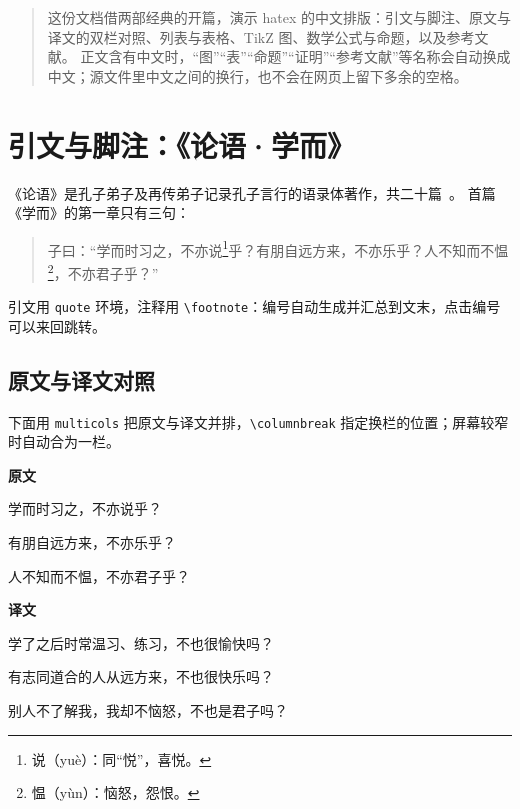 \usetikzlibrary{arrows.meta,positioning}

\begin{abstract}
这份文档借两部经典的开篇，演示 hatex 的中文排版：引文与脚注、原文与译文的双栏对照、列表与表格、TikZ 图、数学公式与命题，以及参考文献。
正文含有中文时，“图”“表”“命题”“证明”“参考文献”等名称会自动换成中文；源文件里中文之间的换行，也不会在网页上留下多余的空格。
\end{abstract}

\section{引文与脚注：《论语·学而》}\label{sec:lunyu}
《论语》是孔子弟子及再传弟子记录孔子言行的语录体著作，共二十篇~\cite{yang1980}。
首篇《学而》的第一章只有三句：
\begin{quote}
子曰：“学而时习之，不亦说\footnote{说（yuè）：同“悦”，喜悦。}乎？有朋自远方来，不亦乐乎？人不知而不愠\footnote{愠（yùn）：恼怒，怨恨。}，不亦君子乎？”
\end{quote}
引文用 \texttt{quote} 环境，注释用 \verb|\footnote|：编号自动生成并汇总到文末，点击编号可以来回跳转。

\subsection{原文与译文对照}\label{sec:parallel}
下面用 \texttt{multicols} 把原文与译文并排，\verb|\columnbreak| 指定换栏的位置；屏幕较窄时自动合为一栏。
\begin{multicols}{2}
\textbf{原文}

学而时习之，不亦说乎？

有朋自远方来，不亦乐乎？

人不知而不愠，不亦君子乎？
\columnbreak

\textbf{译文}

学了之后时常温习、练习，不也很愉快吗？

有志同道合的人从远方来，不也很快乐吗？

别人不了解我，我却不恼怒，不也是君子吗？
\end{multicols}

